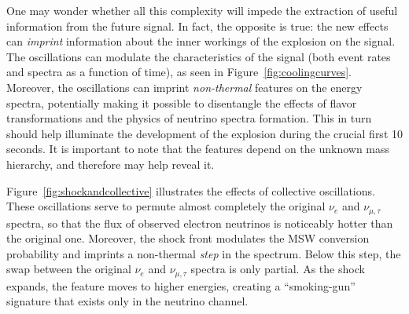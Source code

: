 One may wonder whether all this complexity will impede the extraction of useful information from the future signal. In fact, the opposite is true: the new effects can \emph{imprint} information about the inner workings of the explosion on the signal. The oscillations can modulate the characteristics of the signal (both event rates and spectra as a function of time), as seen in Figure~\ref{fig:coolingcurves}. Moreover, the oscillations can imprint \emph{non-thermal} features on the energy spectra, potentially making it possible to disentangle the effects of flavor transformations and the physics of neutrino spectra formation. This in turn should help %
illuminate the development of the explosion during the crucial first 10 seconds.   It is important to note that the features depend on the unknown mass hierarchy, and therefore may help reveal it. %

Figure~\ref{fig:shockandcollective} illustrates the effects of collective oscillations. %
These oscillations serve to permute almost completely the original $\nu_{e}$ and $\nu_{\mu,\tau}$ spectra, so that the flux of observed electron neutrinos is noticeably hotter than the original one. Moreover, the shock front modulates the MSW conversion probability and imprints a non-thermal \emph{step} in the spectrum.  Below this step, the swap between the original $\nu_{e}$ and $\nu_{\mu,\tau}$ spectra is only partial. As the shock expands, the feature moves to higher energies, creating a ``smoking-gun'' signature that exists only in the neutrino channel. 




